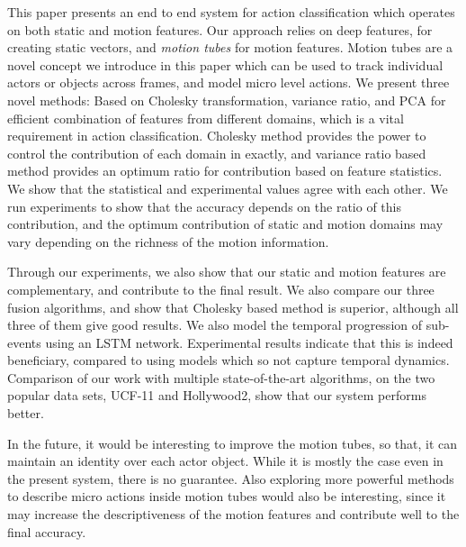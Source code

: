 This paper presents an end to end system for action classification which operates
on both static and motion features. Our approach relies on deep features,
for creating static vectors, and \textit{motion tubes} for motion features.
Motion tubes are a novel concept we introduce in this paper which can be
used to track individual actors or objects across frames, and model micro level actions.
We present three novel methods: Based on Cholesky transformation, variance ratio, and PCA for efficient combination of features
from different domains, which is a vital requirement in action classification.
Cholesky method provides the power to control the contribution of each domain in exactly, and
variance ratio based method  provides an optimum ratio for contribution based on feature statistics. We show that the statistical
and experimental values agree with each other. We run experiments to show that the accuracy depends on the ratio of this contribution, and the optimum contribution of
static and motion domains may vary depending on the richness of the motion information.

Through our experiments, we also show that our static and motion features are complementary,
and contribute to the final result. We also compare our three fusion algorithms, and
show that Cholesky based method is superior, although all three of them give good results. We also model the temporal progression of sub-events using an LSTM network. Experimental
results indicate that this is indeed beneficiary, compared to using models which so not capture temporal dynamics. Comparison of our work with multiple state-of-the-art algorithms, on the two popular data sets, UCF-11 and Hollywood2, show that our system performs better.


In the future, it would be interesting to improve the motion tubes, so that, it can maintain an identity over each actor object.
While it is mostly the case even in the present system, there is no guarantee.
Also exploring more powerful methods to describe micro actions inside motion tubes would also be interesting, since it may increase the descriptiveness of the motion features and
contribute well to the final accuracy.
